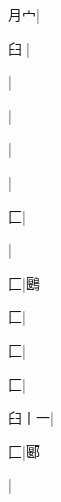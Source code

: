 \begin{multicols}{2}
{{\cjk{}{\cnsym{}　}月{宀}}|{}\par
{\cjk{}{\cnsym{}　}臼{\cnjzr{}}}|{}\par
{}|{}\par
{\cjk{}{\cnsym{}　}{\cnsym{}　}{\cnsym{}　}}|{}\par
{}|{}\par
{\cjk{}{\cnsym{}　}{\cnsym{}　}{\cnsym{}　}}|{}\par
{\cjk{}{\cnsym{}　}{\cnsym{}　}匚}|{}\par
{\cjk{}{\cnsym{}　}{\cnsym{}　}{\cnsym{}　}}|{}\par
{\cjk{}{\cnsym{}　}{\cnsym{}　}匚}|{\cjk{}鶠}\par
{匚}|{}\par
{\cjk{}{\cnsym{}　}{\cnsym{}　}匚}|{}\par
{\cjk{}{\cnsym{}　}{\cnsym{}　}匚}|{}\par
{\cjk{}臼丨一}|{}\par
{\cjk{}{\cnsym{}　}{\cnsym{}　}匚}|{\cjk{}郾}\par
{\cjk{}{\cnsym{}　}{\cnsym{}　}{\cnsym{}　}}|{}\par
}
\end{multicols}
